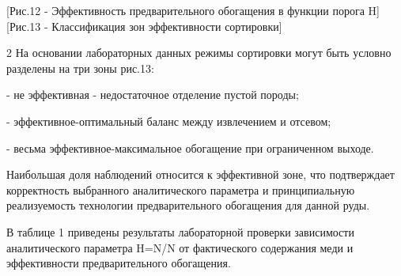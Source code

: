 \begin{figs}
    [Рис.12 - Эффективность предварительного обогащения в функции
порога H]
    [Рис.13 - Классификация зон эффективности сортировки]
\end{figs}

\begin{multicols}{2}
На основании лабораторных данных режимы сортировки могут быть условно
разделены на три зоны рис.13:

- не эффективная - недостаточное отделение пустой породы;

- эффективное-оптимальный баланс между извлечением и отсевом;

- весьма эффективное-максимальное обогащение при ограниченном выходе.

Наибольшая доля наблюдений относится к эффективной зоне, что
подтверждает корректность выбранного аналитического параметра и
принципиальную реализуемость технологии предварительного обогащения для
данной руды.

В таблице 1 приведены результаты лабораторной проверки зависимости
аналитического параметра H=N/N от
фактического содержания меди и эффективности предварительного
обогащения.
\end{multicols}

